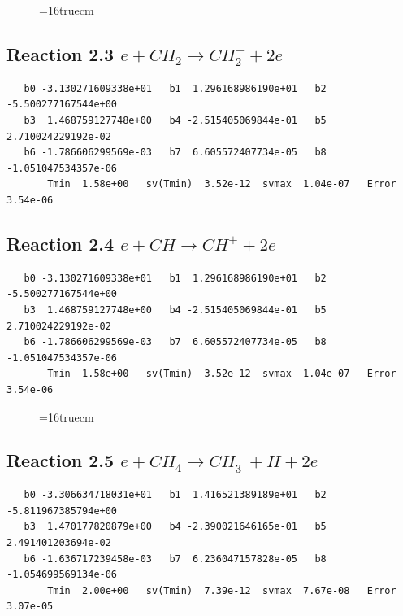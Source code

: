 \documentclass[12pt,dvipdfmx]{article}
\begin{document}
\begin{figure} \label{met.2_2.1}
\epsfxsize=16truecm
\end{figure}
\newpage

\subsection{
Reaction 2.3      $e + CH_2 \rightarrow CH_2^+ + 2e $
}

\begin{small}\begin{verbatim}
   b0 -3.130271609338e+01   b1  1.296168986190e+01   b2 -5.500277167544e+00
   b3  1.468759127748e+00   b4 -2.515405069844e-01   b5  2.710024229192e-02
   b6 -1.786606299569e-03   b7  6.605572407734e-05   b8 -1.051047534357e-06
       Tmin  1.58e+00   sv(Tmin)  3.52e-12  svmax  1.04e-07   Error  3.54e-06
\end{verbatim}\end{small}

\subsection{
Reaction 2.4      $e + CH \rightarrow CH^+ + 2e $
}

\begin{small}\begin{verbatim}
   b0 -3.130271609338e+01   b1  1.296168986190e+01   b2 -5.500277167544e+00
   b3  1.468759127748e+00   b4 -2.515405069844e-01   b5  2.710024229192e-02
   b6 -1.786606299569e-03   b7  6.605572407734e-05   b8 -1.051047534357e-06
       Tmin  1.58e+00   sv(Tmin)  3.52e-12  svmax  1.04e-07   Error  3.54e-06
\end{verbatim}\end{small}

\begin{figure} \label{met.2_2.3}
\epsfxsize=16truecm
\end{figure}
\newpage

\subsection{
Reaction 2.5       $e + CH_4 \rightarrow CH_3^+ + H + 2e $
}

\begin{small}\begin{verbatim}
   b0 -3.306634718031e+01   b1  1.416521389189e+01   b2 -5.811967385794e+00
   b3  1.470177820879e+00   b4 -2.390021646165e-01   b5  2.491401203694e-02
   b6 -1.636717239458e-03   b7  6.236047157828e-05   b8 -1.054699569134e-06
       Tmin  2.00e+00   sv(Tmin)  7.39e-12  svmax  7.67e-08   Error  3.07e-05
\end{verbatim}\end{small}
\end{document}
